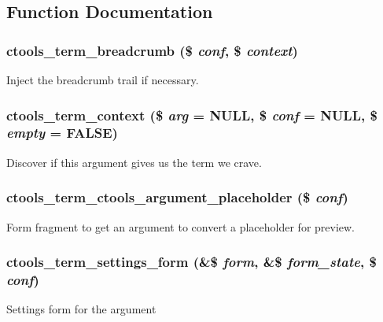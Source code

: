 \subsection{Function Documentation}
\hypertarget{arguments_2term_8inc_ac6b9540df9878fcf5fcd2ccca97911a8}{
\subsubsection[{ctools\_\-term\_\-breadcrumb}]{\setlength{\rightskip}{0pt plus 5cm}ctools\_\-term\_\-breadcrumb (\$ {\em conf}, \/  \$ {\em context})}}
\label{arguments_2term_8inc_ac6b9540df9878fcf5fcd2ccca97911a8}
Inject the breadcrumb trail if necessary. \hypertarget{arguments_2term_8inc_a75a1887ebce05f09df059f33eb495048}{
\subsubsection[{ctools\_\-term\_\-context}]{\setlength{\rightskip}{0pt plus 5cm}ctools\_\-term\_\-context (\$ {\em arg} = {\ttfamily NULL}, \/  \$ {\em conf} = {\ttfamily NULL}, \/  \$ {\em empty} = {\ttfamily FALSE})}}
\label{arguments_2term_8inc_a75a1887ebce05f09df059f33eb495048}
Discover if this argument gives us the term we crave. \hypertarget{arguments_2term_8inc_a24d6278aff14d86da27c59993507ce52}{
\subsubsection[{ctools\_\-term\_\-ctools\_\-argument\_\-placeholder}]{\setlength{\rightskip}{0pt plus 5cm}ctools\_\-term\_\-ctools\_\-argument\_\-placeholder (\$ {\em conf})}}
\label{arguments_2term_8inc_a24d6278aff14d86da27c59993507ce52}
Form fragment to get an argument to convert a placeholder for preview. \hypertarget{arguments_2term_8inc_af4a25873906e508bdf514e26c1d5120d}{
\subsubsection[{ctools\_\-term\_\-settings\_\-form}]{\setlength{\rightskip}{0pt plus 5cm}ctools\_\-term\_\-settings\_\-form (\&\$ {\em form}, \/  \&\$ {\em form\_\-state}, \/  \$ {\em conf})}}
\label{arguments_2term_8inc_af4a25873906e508bdf514e26c1d5120d}
Settings form for the argument 

